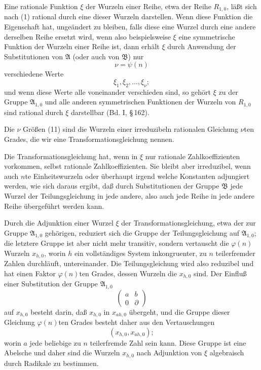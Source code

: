 \documentclass[11pt]{article}
\begin{document}
Eine rationale Funktion $\xi$ der Wurzeln einer Reihe, etwa der Reihe $R_{1,0}$, läßt sich
nach (1) rational durch eine dieser Wurzeln darstellen. Wenn diese Funktion die
Eigenschaft hat, ungeändert zu bleiben, falls diese eine Wurzel durch eine andere derselben
Reihe ersetzt wird, wenn also beispielsweise $\xi$ eine symmetrische Funktion der Wurzeln
einer Reihe ist, dann erhält $\xi$ durch Anwendung der Substitutionen von $\mathfrak A$ (oder
auch von $\mathfrak B$) nur
\begin{equation}
 \nu=\psi(n)
\tag{10}
\end{equation}
verschiedene Werte
\begin{equation}
 \xi_1,\xi_2,\ldots,\xi_\nu;
\tag{11}
\end{equation}
und wenn diese Werte alle voneinander verschieden sind, so gehört $\xi$ zu der Gruppe
$\mathfrak A_{1,0}$ und alle anderen symmetrischen Funktionen der Wurzeln von $R_{1,0}$ sind
rational durch $\xi$ darstellbar (Bd. I, \S\,162).

Die $\nu$ Größen (11) sind die Wurzeln einer irreduzibeln rationalen Gleichung $\nu$ten
Grades, die wir eine Transformationsgleichung nennen.

Die Transformationsgleichung hat, wenn in $\xi$ nur rationale Zahlkoeffizienten vorkommen,
selbst rationale Zahlkoeffizienten. Sie bleibt aber irreduzibel, wenn auch $n$te
Einheitswurzeln oder überhaupt irgend welche Konstanten adjungiert werden, wie sich
daraus ergibt, daß durch Substitutionen der Gruppe $\mathfrak B$ jede Wurzel der
Teilungsgleichung in jede andere, also auch jede Reihe in jede andere Reihe übergeführt
werden kann.

Durch die Adjunktion einer Wurzel $\xi$ der Transformationsgleichung, etwa der zur
Gruppe $\mathfrak A_{1,0}$ gehörigen, reduziert sich die Gruppe der Teilungsgleichung auf
$\mathfrak A_{1,0}$; die letztere Gruppe ist aber nicht mehr transitiv, sondern vertauscht die
$\varphi(n)$ Wurzeln $x_{h,0}$, worin $h$ ein vollständiges System inkongruenter, zu $n$
teilerfremder Zahlen durchläuft, untereinander. Die Teilungsgleichung wird also reduzibel
und hat einen Faktor $\varphi(n)$ten Grades, dessen Wurzeln die $x_{h,0}$ sind. Der Einfluß
einer Substitution der Gruppe $\mathfrak A_{1,0}$
\[
 \begin{pmatrix}a&b\\0&\partial\end{pmatrix}
\]
auf $x_{h,0}$ besteht darin, daß $x_{h,0}$ in $x_{ah,0}$ übergeht, und die Gruppe dieser
Gleichung $\varphi(n)$ten Grades besteht daher aus den Vertauschungen
\[
 (x_{h,0},x_{ah,0});
\]
worin $a$ jede beliebige zu $n$ teilerfremde Zahl sein kann. Diese Gruppe ist eine Abelsche
und daher sind die Wurzeln $x_{h,0}$ nach Adjunktion von $\xi$ algebraisch durch Radikale
zu bestimmen.
\end{document}
